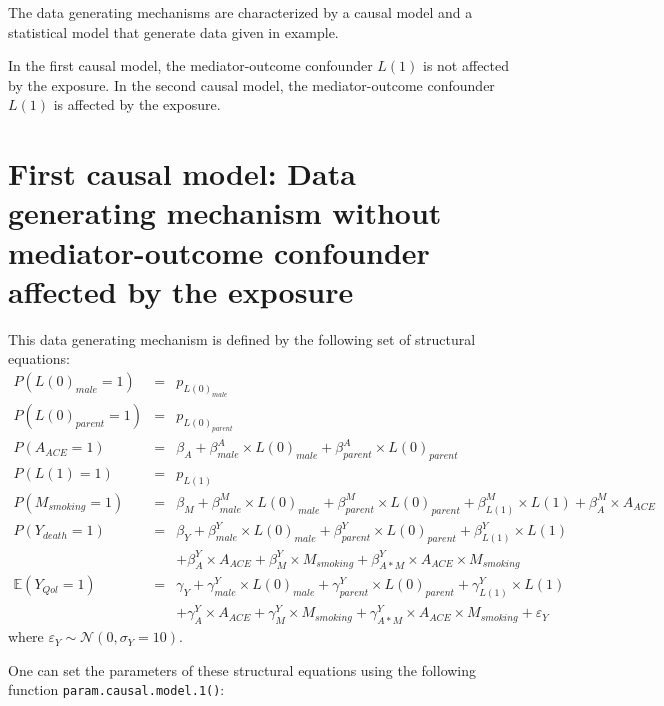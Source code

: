 \documentclass[
]{book}
\begin{document}
The data generating mechanisms are characterized by a causal model and a statistical model that generate data given in example.

In the first causal model, the mediator-outcome confounder \(L(1)\) is not affected by the exposure. In the second causal model, the mediator-outcome confounder \(L(1)\) is affected by the exposure.

\hypertarget{first-causal-model-data-generating-mechanism-without-mediator-outcome-confounder-affected-by-the-exposure}{%
\section{First causal model: Data generating mechanism without mediator-outcome confounder affected by the exposure}\label{first-causal-model-data-generating-mechanism-without-mediator-outcome-confounder-affected-by-the-exposure}}

This data generating mechanism is defined by the following set of structural equations:
\[\begin{array}{lll}
P(L(0)_{male} = 1) &=& p_{L(0)_{male}}\\
P(L(0)_{parent} = 1) &=& p_{L(0)_{parent}}\\
P(A_{ACE} = 1) &=& \beta_{A} + \beta_{male}^A \times L(0)_{male} + \beta_{parent}^A \times L(0)_{parent}\\
P(L(1) = 1) &=& p_{L(1)}\\
P(M_{smoking} = 1) &=& \beta_{M} + \beta_{male}^M \times L(0)_{male} + \beta_{parent}^M \times L(0)_{parent} + \beta_{L(1)}^M \times L(1) + \beta_{A}^M \times A_{ACE}\\
P(Y_{death} = 1) &=& \beta_{Y} + \beta_{male}^Y \times L(0)_{male} + \beta_{parent}^Y \times L(0)_{parent} + \beta_{L(1)}^Y \times L(1)\\
                 & & + \beta_{A}^Y \times A_{ACE} + \beta_{M}^Y \times M_{smoking} + \beta_{A \ast M }^Y \times A_{ACE} \times M_{smoking}\\
\mathbb{E}(Y_{Qol} = 1) &=& \gamma_{Y} + \gamma_{male}^Y \times L(0)_{male} + \gamma_{parent}^Y \times L(0)_{parent} + \gamma_{L(1)}^Y \times L(1)\\
                        & &+ \gamma_{A}^Y \times A_{ACE} + \gamma_{M}^Y \times M_{smoking} + \gamma_{A \ast M }^Y \times A_{ACE} \times M_{smoking} + \varepsilon_Y
\end{array}\]
where \(\varepsilon_Y \sim \mathcal{N}(0,\sigma_Y = 10)\).

One can set the parameters of these structural equations using the following function \texttt{param.causal.model.1()}:
\end{document}
